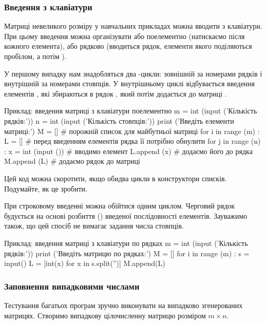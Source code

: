 \subsubsection{Введення з клавіатури}

Матриці невеликого розміру у навчальних прикладах можна вводити з клавіатури. При цьому введення можна організувати або поелементно (натискаємо  після кожного елемента), або рядково (вводиться рядок, елементи якого поділяються пробілом, а потім ).

У першому випадку нам знадобляться два -цикли: зовнішній за номерами рядків і внутрішній за номерами стовпців. У внутрішньому циклі відбувається введення елементів , які збираються в рядок , який потім додається до матриці .

\begin{py}{Приклад: введення матриці з клавіатури поелементно}
m = int (input ('Кількість рядків:'))
n = int (input ('Кількість стовпців:'))
print ('Введіть елементи матриці:')
M = [] # порожній список для майбутньої матриці
for i in range (m) :
L = [] # перед введенням елементів рядка її потрібно обнулити
    for j in range (n) :
        x = int (input ()) # вводимо елемент
        L.append (x) # додаємо його до рядка
    M.append (L) # додаємо рядок до матриці
\end{py}

Цей код можна скоротити, якщо обидва цикли в конструктори списків. Подумайте, як це зробити.

При строковому введенні можна обійтися одним циклом. Черговий рядок будується на основі розбиття () введеної послідовності елементів. Зауважимо також, що цей спосіб не вимагає задання числа стовпців.

\begin{py}{Приклад: введення матриці з клавіатури по рядках}
m = int (input ('Кількість рядків:'))
print ('Введіть матрицю по рядках:')
M = []
for i in range (m) :
    s = input()
    L = [int(x) for x in s.split('')]
    M.append(L)
\end{py}

\subsubsection{Заповнення випадковими числами}

Тестування багатьох програм зручно виконувати на випадково згенерованих матрицях. Створимо випадкову цілочисленну матрицю розміром $ m \times n $.

